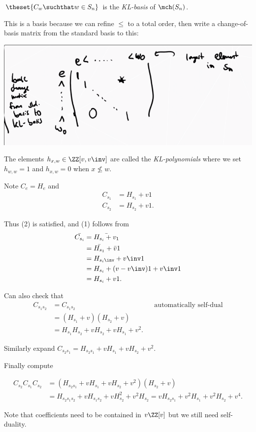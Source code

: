 \begin{definition}[?]

\(\theset{C_w \suchthat w\in S_n}\) is the \emph{KL-basis} of
\(\mch(S_n)\).

\end{definition}

This is a basis because we can refine \(\leq\) to a total order, then
write a change-of-basis matrix from the standard basis to this:

\includegraphics{figures/image_2020-07-13-11-59-25.png}

The elements \(h_{x, w} \in \ZZ[v, v\inv]\) are called the
\emph{KL-polynomials} where we set \(h_{w, w} = 1\) and \(h_{x, w} = 0\)
when \(x\not\leq w\).

\begin{example}

Note \(C_e = H_e\) and
\begin{align*}  
C_{s_1} &= H_{s_1} + v1 \\
C_{s_2} &= H_{s_2} + v1
.\end{align*}

Thus (2) is satisfied, and (1) follows from
\begin{align*}
\bar{C_{s_i}} 
&= \bar{H_{s_i} + v_1} \\
&= \bar{H_{s_1}} + \bar{v} 1 \\
&= H_{s_i\inv} + v\inv 1 \\
&= H_{s_i} + (v-v\inv)1 + v\inv 1 \\
&= H_{s_i} + v1
.\end{align*}

Can also check that
\begin{align*}
C_{s_1 s_2} &= C_{s_1 s_2} 
&&\text{automatically self-dual} \\
&= (H_{s_1} + v) (H_{s_2} + v) \\
&= H_{s_1} H_{s_2} + v H_{s_2} + vH_{s_1} + v^2
.\end{align*}

Similarly expand
\(C_{s_2 s_1} = H_{s_2 s_1} + vH_{s_1} + vH_{s_2} + v^2\).

Finally compute

\begin{align*}
C_{s_2} C_{s_1} C_{s_2} 
&= (H_{s_2 s_1} +v H_{s_1} + vH_{s_2} + v^2 )(H_{s_2} + v) \\
&= H_{s_2 s_1 s_2} + v H_{s_1 s_2} + v H_{s_2}^2 + v^2 H_{s_2} = v H_{s_2 s_1} + v^2 H_{s_1} + v^2 H_{s_2} + v^4
.\end{align*}

Note that coefficients need to be contained in \(v\ZZ[v]\) but we still
need self-duality.

\end{example}

